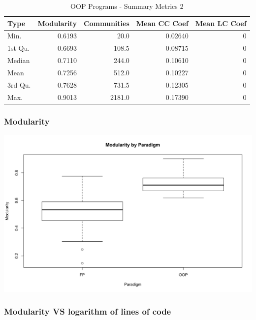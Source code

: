 \documentclass[12pt, a4paper]{article}
\begin{document}
\begin{longtable}[H]{l r r r r}
    \caption{OOP Programs - Summary Metrics 2}\label{table:oop_sum_metrics_2}\\
        Type & Modularity & Communities & Mean CC Coef & Mean LC Coef \\
        \hline            
        \endhead
        Min.    & 0.6193 &   20.0 & 0.02640 & 0 \\    
        1st Qu. & 0.6693 &  108.5 & 0.08715 & 0 \\    
        Median  & 0.7110 &  244.0 & 0.10610 & 0 \\    
        Mean    & 0.7256 &  512.0 & 0.10227 & 0 \\    
        3rd Qu. & 0.7628 &  731.5 & 0.12305 & 0 \\    
        Max.    & 0.9013 & 2181.0 & 0.17390 & 0 
\end{longtable}

\subsubsection{Modularity}

\begin{minipage}[t]{\linewidth}
    \includegraphics[width=\textwidth]{modularity_paradigm.png}
    \captionsetup{type=figure}
    \label{fig:modularity_paradigm}
  \end{minipage}


\subsubsection{Modularity VS logarithm of lines of code}
\end{document}
